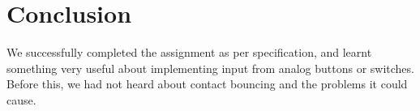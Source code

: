 \section{Conclusion}
We successfully completed the assignment as per specification, and learnt something very useful about implementing input from analog buttons or switches. Before this, we had not heard about contact bouncing and the problems it could cause.
